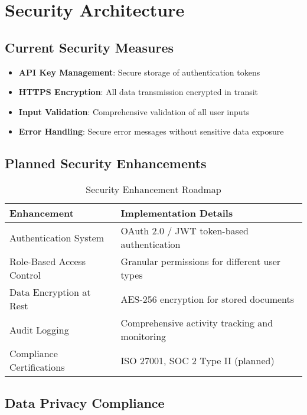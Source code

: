 \documentclass[11pt,a4paper]{article}
\begin{document}
\section{Security Architecture}

\subsection{Current Security Measures}

\begin{itemize}
    \item \textbf{API Key Management}: Secure storage of authentication tokens
    \item \textbf{HTTPS Encryption}: All data transmission encrypted in transit
    \item \textbf{Input Validation}: Comprehensive validation of all user inputs
    \item \textbf{Error Handling}: Secure error messages without sensitive data exposure
\end{itemize}

\subsection{Planned Security Enhancements}

\begin{table}[H]
\centering
\begin{tabular}{p{4cm}p{8cm}}
\toprule
\textbf{Enhancement} & \textbf{Implementation Details} \\
\midrule
Authentication System & OAuth 2.0 / JWT token-based authentication \\
Role-Based Access Control & Granular permissions for different user types \\
Data Encryption at Rest & AES-256 encryption for stored documents \\
Audit Logging & Comprehensive activity tracking and monitoring \\
Compliance Certifications & ISO 27001, SOC 2 Type II (planned) \\
\bottomrule
\end{tabular}
\caption{Security Enhancement Roadmap}
\end{table}

\subsection{Data Privacy Compliance}
\end{document}

